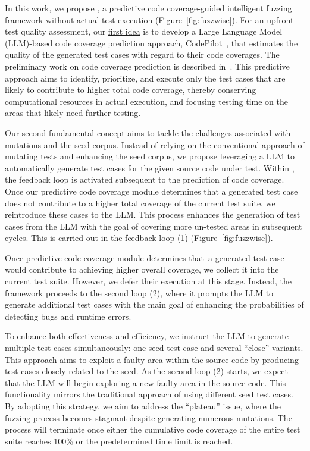 In this work, we propose {\tool}, a predictive code coverage-guided
intelligent fuzzing framework without actual test execution
(Figure~\ref{fig:fuzzwise}). For an upfront test quality assessment,
our \underline{first idea} is to develop a Large Language Model (LLM)-based code
coverage prediction approach, CodePilot~\cite{forge24}, that estimates
the quality of the generated test cases with regard to their code
coverages. The preliminary work on code coverage prediction is
described in~\cite{forge24}. This predictive approach aims to
identify, prioritize, and execute only the test cases that are likely
to contribute to higher total code coverage, thereby conserving
computational resources in actual execution, and focusing testing time
on the areas that likely need further testing.

Our \underline{second fundamental concept} aims to tackle the challenges
associated with mutations and the seed corpus. Instead of relying on
the conventional approach of mutating tests and enhancing the seed
corpus, we propose leveraging a LLM to automatically generate test
cases for the given source code under test. Within {\tool}, the
feedback loop is activated subsequent to the prediction of code
coverage. Once our predictive code coverage module determines that a
generated test case does not contribute to a higher total coverage of
the current test suite, we reintroduce these cases to the LLM.
This process enhances the generation of test cases from the LLM with
the goal of covering more un-tested areas in subsequent cycles. This
is carried out in the feedback loop (1) (Figure~\ref{fig:fuzzwise}).

Once predictive code coverage module determines that~a generated
test case would contribute to achieving higher overall coverage, we
collect it into the current test suite. However, we defer their
execution at this stage. Instead, the framework proceeds to the second
loop (2), where it prompts the LLM to generate additional test cases
with the main goal of enhancing the probabilities of detecting bugs and
runtime errors.

To enhance both effectiveness and efficiency, we instruct the LLM to
generate multiple test cases simultaneously: one seed test case and
several ``close'' variants. This approach aims to exploit a
faulty area within the source code by producing test cases closely
related to the seed. As the second loop (2) starts, we
expect that the LLM will begin exploring a new faulty area in the
source code. This functionality mirrors the traditional approach of
using different seed test cases. By adopting this strategy, we aim to
address the ``plateau'' issue, where the fuzzing process becomes
stagnant despite generating numerous mutations. The process will
terminate once either the cumulative code coverage of the entire test
suite reaches 100\% or the predetermined time limit is reached.


